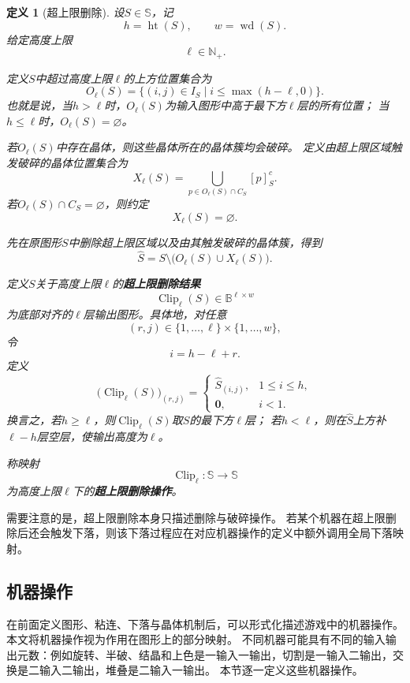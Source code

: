 \documentclass[UTF8,fontset=none]{ctexart}
\theoremstyle{cnthm}
\newtheorem{definition}{定义}[section]
\begin{document}
			\begin{definition}[超上限删除]
				设$S\in\mathbb{S}$，记
				$$
				h=\operatorname{ht}(S),
				\qquad
				w=\operatorname{wd}(S).
				$$
				给定高度上限
				$$
				\ell\in\mathbb{N}_{+}.
				$$
				
				定义$S$中超过高度上限$\ell$的上方位置集合为
				$$
				O_\ell(S)
				=
				\{(i,j)\in I_S\mid i\leq \max(h-\ell,0)\}.
				$$
				也就是说，当$h>\ell$时，$O_\ell(S)$为输入图形中高于最下方$\ell$层的所有位置；
				当$h\leq \ell$时，$O_\ell(S)=\varnothing$。
				
				若$O_\ell(S)$中存在晶体，则这些晶体所在的晶体簇均会破碎。
				定义由超上限区域触发破碎的晶体位置集合为
				$$
				X_\ell(S)
				=
				\bigcup_{p\in O_\ell(S)\cap C_S}[p]^c_S.
				$$
				若$O_\ell(S)\cap C_S=\varnothing$，则约定
				$$
				X_\ell(S)=\varnothing.
				$$
				
				先在原图形$S$中删除超上限区域以及由其触发破碎的晶体簇，得到
				$$
				\widehat{S}
				=
				S\setminus\bigl(O_\ell(S)\cup X_\ell(S)\bigr).
				$$
				
				定义$S$关于高度上限$\ell$的\textbf{超上限删除结果}
				$$
				\operatorname{Clip}_\ell(S)\in\mathbb{B}^{\ell\times w}
				$$
				为底部对齐的$\ell$层输出图形。具体地，对任意
				$$
				(r,j)\in\{1,\dots,\ell\}\times\{1,\dots,w\},
				$$
				令
				$$
				i=h-\ell+r.
				$$
				定义
				$$
				\bigl(\operatorname{Clip}_\ell(S)\bigr)_{(r,j)}
				=
				\begin{cases}
					\widehat{S}_{(i,j)}, & 1\leq i\leq h,\\
					\mathbf{0}, & i<1.
				\end{cases}
				$$
				换言之，若$h\geq\ell$，则$\operatorname{Clip}_\ell(S)$取$\widehat{S}$的最下方$\ell$层；
				若$h<\ell$，则在$\widehat{S}$上方补$\ell-h$层空层，使输出高度为$\ell$。
				
				称映射
				$$
				\operatorname{Clip}_\ell:\mathbb{S}\to\mathbb{S}
				$$
				为高度上限$\ell$下的\textbf{超上限删除操作}。
			\end{definition}
			
			需要注意的是，超上限删除本身只描述删除与破碎操作。
			若某个机器在超上限删除后还会触发下落，则该下落过程应在对应机器操作的定义中额外调用全局下落映射。
			
		\subsection{机器操作}
			
			在前面定义图形、粘连、下落与晶体机制后，可以形式化描述游戏中的机器操作。
			本文将机器操作视为作用在图形上的部分映射。
			不同机器可能具有不同的输入输出元数：例如旋转、半破、结晶和上色是一输入一输出，切割是一输入二输出，交换是二输入二输出，堆叠是二输入一输出。
			本节逐一定义这些机器操作。
			
\end{document}
